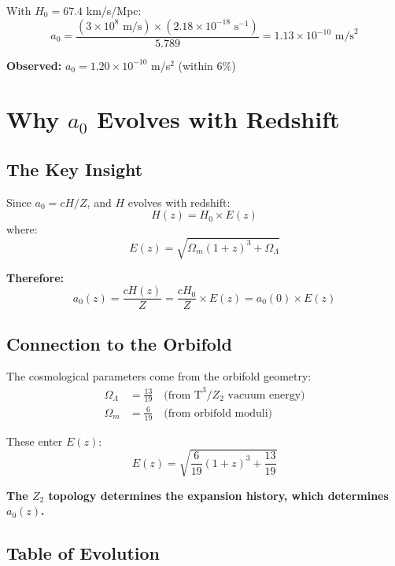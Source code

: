 \documentclass[12pt,a4paper]{article}
\begin{document}
With $H_0 = 67.4$ km/s/Mpc:
\begin{equation}
a_0 = \frac{(3 \times 10^8 \text{ m/s}) \times (2.18 \times 10^{-18} \text{ s}^{-1})}{5.789} = 1.13 \times 10^{-10} \text{ m/s}^2
\end{equation}

\textbf{Observed:} $a_0 = 1.20 \times 10^{-10}$ m/s$^2$ (within 6\%)

\section{Why $a_0$ Evolves with Redshift}

\subsection{The Key Insight}

Since $a_0 = cH/Z$, and $H$ evolves with redshift:
\begin{equation}
H(z) = H_0 \times E(z)
\end{equation}
where:
\begin{equation}
E(z) = \sqrt{\Omega_m(1+z)^3 + \Omega_\Lambda}
\end{equation}

\textbf{Therefore:}
\begin{equation}
\boxed{a_0(z) = \frac{cH(z)}{Z} = \frac{cH_0}{Z} \times E(z) = a_0(0) \times E(z)}
\end{equation}

\subsection{Connection to the Orbifold}

The cosmological parameters come from the orbifold geometry:
\begin{align}
\Omega_\Lambda &= \frac{13}{19} \quad \text{(from T}^3/Z_2 \text{ vacuum energy)} \\
\Omega_m &= \frac{6}{19} \quad \text{(from orbifold moduli)}
\end{align}

These enter $E(z)$:
\begin{equation}
E(z) = \sqrt{\frac{6}{19}(1+z)^3 + \frac{13}{19}}
\end{equation}

\textbf{The $Z_2$ topology determines the expansion history, which determines $a_0(z)$.}

\subsection{Table of Evolution}
\end{document}
